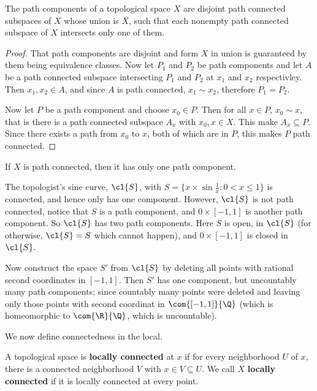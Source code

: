 \begin{theorem}\label{3.3.5}
    The path components of a topological space $X$ are disjoint path connected subspaces of $X$
    whose union is $X$, such that each nonempty path connected subspace of $X$ intersects only one
    of them.
\end{theorem}
\begin{proof}
    That path components are disjoint and form $X$ in union is guaranteed by them being equivalence
    classes. Now let  $P_1$ and $P_2$ be path components and let $A$ be a path connected subspace
    intersecting  $ P_1$ and $ P_2$ at $ x_1$ and $x_2$ respectivley. Then $ x_1,x_2 \in A$, and since
    $A$ is path connected, $ x_1 \sim x_2$, therefore $P_1=P_2$.

    Now let $P$ be a path component and choose $ x_0 \in P$. Then for all $x \in P$,  $ x_0 \sim x$,
    that is there is a path connected subspace $A_x$ with  $ x_0,x \in X$. This make $A_x \subseteq
    P$. Since there exists a path from  $ x_0$ to $x$, both of which are in  $P$, this makes  $P$
    path connected.
\end{proof}
\begin{corollary}
    If $X$ is path connected, then it has only one path component.
\end{corollary}

\begin{example}
    The topologist's sine curve, $\cl{S}$, with $S=\{x \times \sin{\frac{1}{x}}: 0 < x \leq 1\}$ is
    connected, and hence only has one component. However, $\cl{S}$ is not path connected, notice
    that $S$ is a path component, and  $0 \times [-1,1]$ is another path component. So $\cl{S}$ has
    two path components. Here $S$ is open, in  $\cl{S}$ (for otherwise, $\cl{S}=S$ which cannot
    happen), and $0 \times [-1,1]$ is closed in $\cl{S}$.

    Now construct the space $S'$ from  $\cl{S}$ by deleting all points with rational second
    coordinates in $[-1,1]$. Then $S'$ has one component, but uncountably many path components;
    since countably many points were deleted and leaving only those points with second coordinat in
    $\com{[-1,1]}{\Q}$ (which is homeomorphic to $\com{\R}{\Q}$, which is uncountable).
\end{example}

We now define connectedness in the local.

\begin{definition}
    A topological space is \textbf{locally connected} at $x$ if for every neighborhood  $U$ of  $x$,
    there is a connected neighborhood  $V$ with $x \in V \subseteq U$. We call  $X$  \textbf{locally
    connected} if it is locally connected at every point.
\end{definition}

